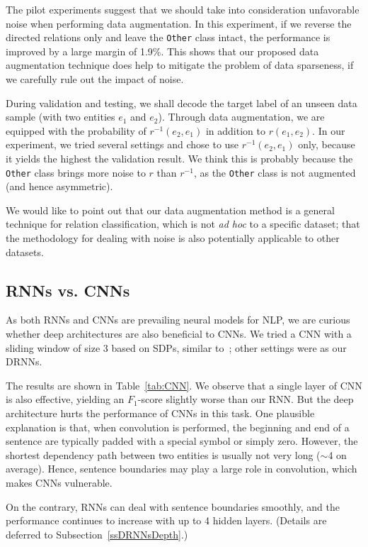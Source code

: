\documentclass[11pt]{article}
\begin{document}
The pilot experiments suggest that we should take into consideration unfavorable noise when performing data augmentation. In this experiment, if we reverse the directed relations only and leave the {\tt Other} class intact, the performance is improved by a large margin of 1.9\%.
This shows that our proposed data augmentation technique does help to mitigate the problem of data sparseness, if we carefully rule out the impact of noise.

During validation and testing, we shall decode the target label of an unseen data sample (with two entities  $e_1$ and $e_2$). Through data augmentation, we are equipped with the probability of $r^{-1}(e_2, e_1)$ in addition to $r(e_1, e_2)$. In our experiment, we tried several settings and chose to use $r^{-1}(e_2, e_1)$ only, because it yields the highest the validation result. We think this is probably because the {\tt Other} class brings more noise to $r$ than $r^{-1}$, as the {\tt Other} class is not augmented (and hence asymmetric).

We would like to point out that our data augmentation method is a general technique for relation classification, which is not \textit{ad hoc} to a specific dataset; that the methodology for dealing with noise is also potentially applicable to other datasets.




\subsection{RNNs vs. CNNs}\label{ssRNNCNN}

As both RNNs and CNNs are prevailing neural models for NLP, we are curious whether deep architectures are also beneficial to CNNs. We tried a CNN with a sliding window of size 3 based on SDPs, similar to~; other settings were as our DRNNs.

The results are shown in Table~\ref{tab:CNN}. We observe that a single layer of CNN is also effective, yielding an $F_1$-score slightly worse than our RNN. But the deep architecture hurts the performance of CNNs in this task. One plausible explanation is that, when convolution is performed, the beginning and end of a sentence are typically padded with a special symbol or simply zero. However, the shortest dependency path between two entities is usually not very long ($\sim$4 on average). Hence, sentence boundaries may play a large role in convolution, which makes CNNs vulnerable.

On the contrary, RNNs can deal with sentence boundaries smoothly, and the performance continues to increase with up to 4 hidden layers. (Details are deferred to Subsection~\ref{ssDRNNsDepth}.)
\end{document}
